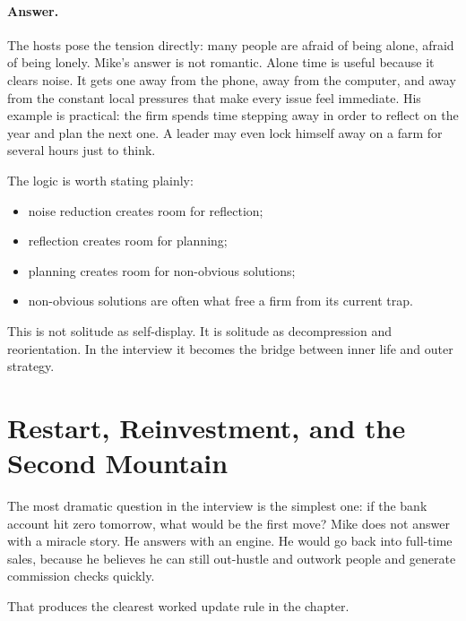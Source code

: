 \paragraph{Answer.} The hosts pose the tension directly: many people are afraid of being alone, afraid of being lonely. Mike's answer is not romantic. Alone time is useful because it clears noise. It gets one away from the phone, away from the computer, and away from the constant local pressures that make every issue feel immediate. His example is practical: the firm spends time stepping away in order to reflect on the year and plan the next one. A leader may even lock himself away on a farm for several hours just to think.

The logic is worth stating plainly:
\begin{itemize}
\item noise reduction creates room for reflection;
\item reflection creates room for planning;
\item planning creates room for non-obvious solutions;
\item non-obvious solutions are often what free a firm from its current trap.
\end{itemize}
This is not solitude as self-display. It is solitude as decompression and reorientation. In the interview it becomes the bridge between inner life and outer strategy.

\section{Restart, Reinvestment, and the Second Mountain}

The most dramatic question in the interview is the simplest one: if the bank account hit zero tomorrow, what would be the first move? Mike does not answer with a miracle story. He answers with an engine. He would go back into full-time sales, because he believes he can still out-hustle and outwork people and generate commission checks quickly.

That produces the clearest worked update rule in the chapter.

